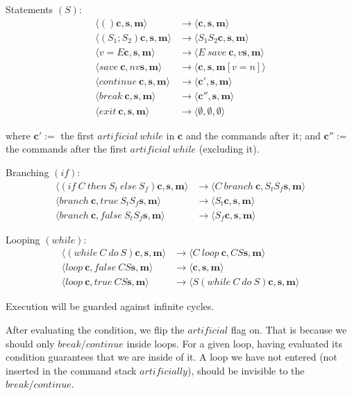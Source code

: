 \documentclass[11pt]{report}
\begin{document}
\vspace{2em}
\noindent Statements $(S)$:
\begin{align*}
\langle ()  \bm{c},  \bm{s},  \bm{m} \rangle    &\rightarrow   \langle  \bm{c},  \bm{s},  \bm{m} \rangle \\
\langle (S_1 ; S_2)  \bm{c},  \bm{s},  \bm{m} \rangle    &\rightarrow   \langle S_1 S_2  \bm{c},  \bm{s},  \bm{m} \rangle \\
\langle v=E  \bm{c},  \bm{s},  \bm{m} \rangle    &\rightarrow   \langle E\ save\  \bm{c}, v  \bm{s},  \bm{m} \rangle \\
\langle save \  \bm{c}, n v  \bm{s},  \bm{m} \rangle    &\rightarrow   \langle  \bm{c},  \bm{s},  \bm{m}[v=n] \rangle \\
\langle continue \  \bm{c}, \bm{s},  \bm{m} \rangle    &\rightarrow   \langle  \bm{c'},  \bm{s},  \bm{m} \rangle \\
\langle break \  \bm{c}, \bm{s},  \bm{m} \rangle    &\rightarrow   \langle  \bm{c''},  \bm{s},  \bm{m} \rangle \\
\langle exit \  \bm{c}, \bm{s},  \bm{m} \rangle    &\rightarrow   \langle  \emptyset,  \emptyset, \emptyset \rangle
\end{align*}

where $\bm{c'} :=$  the first $artificial\ while$ in $\bm{c}$ and the commands after it; and $\bm{c''} :=$ the commands after the first $artificial\ while$ (excluding it).


\newpage
\noindent Branching $(if)$:
\begin{align*}
\langle (if\ C\ then\ S_t\ else\ S_f)  \bm{c},  \bm{s},  \bm{m} \rangle    &\rightarrow   \langle C\ branch\  \bm{c}, S_t S_f  \bm{s},  \bm{m} \rangle \\
\langle branch\  \bm{c}, true\  S_t S_f  \bm{s},  \bm{m} \rangle    &\rightarrow   \langle S_t  \bm{c},  \bm{s},  \bm{m} \rangle \\
\langle branch\  \bm{c}, false\ S_t S_f  \bm{s},  \bm{m} \rangle    &\rightarrow   \langle S_f  \bm{c},  \bm{s},  \bm{m} \rangle
\end{align*}


\vspace{2em}
\noindent Looping $(while)$:
\begin{align*}
\langle (while\ C\ do\ S)  \bm{c},  \bm{s},  \bm{m} \rangle    &\rightarrow  \langle C\ loop\  \bm{c}, C S  \bm{s},  \bm{m} \rangle \\
\langle loop\  \bm{c}, false\ C S  \bm{s},  \bm{m} \rangle    &\rightarrow   \langle  \bm{c},  \bm{s},  \bm{m} \rangle \\
\langle loop\  \bm{c}, true\  C S  \bm{s},  \bm{m} \rangle    &\rightarrow   \langle S (while\ C\ do\ S)  \bm{c},  \bm{s},  \bm{m} \rangle 
\end{align*}

Execution will be guarded against infinite cycles.

After evaluating the condition, we flip the $artificial$ flag on. That is because we should only $break/continue$ inside loops. For a given loop, having evaluated its condition guarantees that we are inside of it. A loop we have not entered (not inserted in the command stack $artificially$), should be invisible to the $break/continue$.
\end{document}
